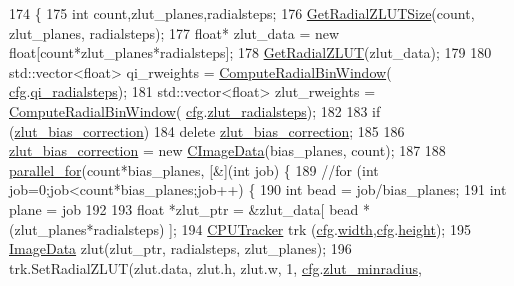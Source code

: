 \begin{DoxyCode}
174 \{
175     \textcolor{keywordtype}{int} count,zlut\_planes,radialsteps;
176     \hyperlink{class_queued_tracker_a95e19cdbbaa59eb676a24aaf95058b27}{GetRadialZLUTSize}(count, zlut\_planes, radialsteps);
177     \textcolor{keywordtype}{float}* zlut\_data = \textcolor{keyword}{new} \textcolor{keywordtype}{float}[count*zlut\_planes*radialsteps];
178     \hyperlink{class_queued_tracker_a7e92adfa46401d802eaff7687e43dad7}{GetRadialZLUT}(zlut\_data);
179 
180     std::vector<float> qi\_rweights = \hyperlink{utils_8cpp_a8657c1536ca3621943042411f4644e21}{ComputeRadialBinWindow}(
      \hyperlink{class_queued_tracker_afb847e7f49e0af6027d58af51d5914dc}{cfg}.\hyperlink{struct_q_trk_computed_config_ab1a11e7a567a3267c57f77626c6c9c93}{qi\_radialsteps});
181     std::vector<float> zlut\_rweights = \hyperlink{utils_8cpp_a8657c1536ca3621943042411f4644e21}{ComputeRadialBinWindow}(
      \hyperlink{class_queued_tracker_afb847e7f49e0af6027d58af51d5914dc}{cfg}.\hyperlink{struct_q_trk_computed_config_ad1a121fa7d3152df6788ff285e4d2dc6}{zlut\_radialsteps});
182 
183     \textcolor{keywordflow}{if} (\hyperlink{class_queued_tracker_a6f5a5a506c622ee1c174cd497c5152b9}{zlut\_bias\_correction})
184         \textcolor{keyword}{delete} \hyperlink{class_queued_tracker_a6f5a5a506c622ee1c174cd497c5152b9}{zlut\_bias\_correction};
185 
186     \hyperlink{class_queued_tracker_a6f5a5a506c622ee1c174cd497c5152b9}{zlut\_bias\_correction} = \textcolor{keyword}{new} \hyperlink{class_c_image_data}{CImageData}(bias\_planes, count);
187 
188     \hyperlink{threads_8h_a6693c34b211b5d81e0d7a362457d0449}{parallel\_for}(count*bias\_planes, [&](\textcolor{keywordtype}{int} job) \{
189     \textcolor{comment}{//for (int job=0;job<count*bias\_planes;job++) \{}
190         \textcolor{keywordtype}{int} bead = job/bias\_planes;
191         \textcolor{keywordtype}{int} plane = job%
192         
193         \textcolor{keywordtype}{float} *zlut\_ptr = &zlut\_data[ bead * (zlut\_planes*radialsteps) ];
194         \hyperlink{class_c_p_u_tracker}{CPUTracker} trk (\hyperlink{class_queued_tracker_afb847e7f49e0af6027d58af51d5914dc}{cfg}.\hyperlink{struct_q_trk_settings_aef24eb3a4692bd67ff1aca8ef950e08d}{width},\hyperlink{class_queued_tracker_afb847e7f49e0af6027d58af51d5914dc}{cfg}.\hyperlink{struct_q_trk_settings_a94c965d103e7a0a4f1fced8eee1324ce}{height});
195         \hyperlink{struct_t_image_data}{ImageData} zlut(zlut\_ptr, radialsteps, zlut\_planes);
196         trk.SetRadialZLUT(zlut.data, zlut.h, zlut.w, 1, \hyperlink{class_queued_tracker_afb847e7f49e0af6027d58af51d5914dc}{cfg}.\hyperlink{struct_q_trk_settings_a1a14537a9e784c65eed512e72ee86c02}{zlut\_minradius},

\end{DoxyCode}
